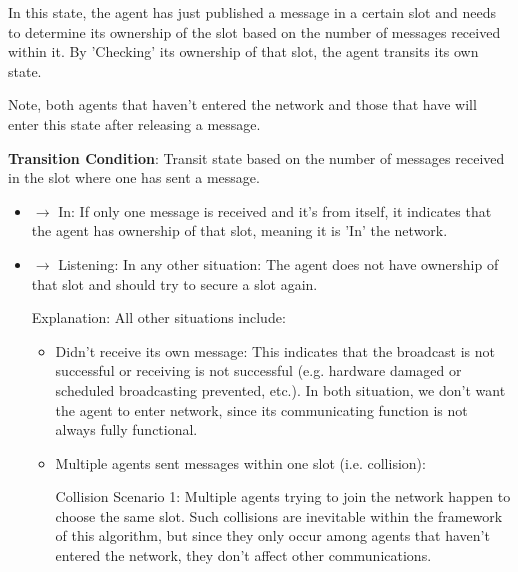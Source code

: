 \begin{enumerate}
    In this state, the agent has just published a message in a certain slot and needs to determine its ownership of the slot based on the number of messages received within it.
    By 'Checking' its ownership of that slot, the agent transits its own state.

    Note, both agents that haven't entered the network and those that have will enter this state after releasing a message.

    \textbf{Transition Condition}: Transit state based on the number of messages received in the slot where one has sent a message.
    \begin{itemize}
        \item $\rightarrow$ In: If only one message is received and it's from itself, it indicates that the agent has ownership of that slot, meaning it is 'In' the network.
        \item $\rightarrow$ Listening: In any other situation: The agent does not have ownership of that slot and should try to secure a slot again.
        
        Explanation: All other situations include:
        \begin{itemize}
            \item Didn't receive its own message: This indicates that the broadcast is not successful or receiving is not successful (e.g. hardware damaged or scheduled broadcasting prevented, etc.). In both situation, we don't want the agent to enter network, since its communicating function is not always fully functional. 
            \item Multiple agents sent messages within one slot (i.e. collision):
            
            Collision Scenario 1: Multiple agents trying to join the network happen to choose the same slot. Such collisions are inevitable within the framework of this algorithm, but since they only occur among agents that haven't entered the network, they don't affect other communications.


\end{itemize}
\end{itemize}
\end{enumerate}
